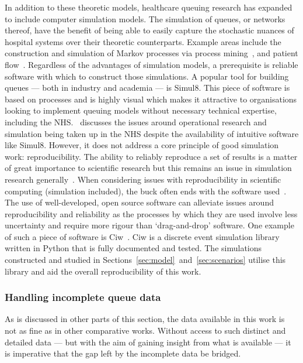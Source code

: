 In addition to these theoretic models, healthcare queuing research has expanded
to include computer simulation models. The simulation of queues, or networks
thereof, have the benefit of being able to easily capture the stochastic nuances
of hospital systems over their theoretic counterparts. Example areas include the
construction and simulation of Markov processes via process
mining~\cite{Arnolds2018,Rebuge2012}, and patient flow~\cite{Bhattacharjee2014}.
Regardless of the advantages of simulation models, a prerequisite is reliable
software with which to construct those simulations. A popular tool for building
queues --- both in industry and academia --- is Simul8. This piece of software
is based on processes and is highly visual which makes it attractive to
organisations looking to implement queuing models without necessary technical
expertise, including the NHS.~\cite{Brailsford2013} discusses the issues around
operational research and simulation being taken up in the NHS despite the
availability of intuitive software like Simul8. However, it does not address a
core principle of good simulation work: reproducibility. The ability to reliably
reproduce a set of results is a matter of great importance to scientific
research but this remains an issue in simulation research
generally~\cite{Fitzpatrick2019}. When considering issues with reproducibility
in scientific computing (simulation included), the buck often ends with the
software used~\cite{Ivie2018}. The use of well-developed, open source software
can alleviate issues around reproducibility and reliability as the processes by
which they are used involve less uncertainty and require more rigour than
`drag-and-drop' software. One example of such a piece of software is
Ciw~\cite{Palmer2019}. Ciw is a discrete event simulation library written in
Python that is fully documented and tested. The simulations constructed and
studied in Sections~\ref{sec:model}~and~\ref{sec:scenarios} utilise this library
and aid the overall reproducibility of this work.

\subsubsection{Handling incomplete queue data}

As is discussed in other parts of this section, the data available in this work
is not as fine as in other comparative works. Without access to such distinct
and detailed data --- but with the aim of gaining insight from what is available
--- it is imperative that the gap left by the incomplete data be bridged.

